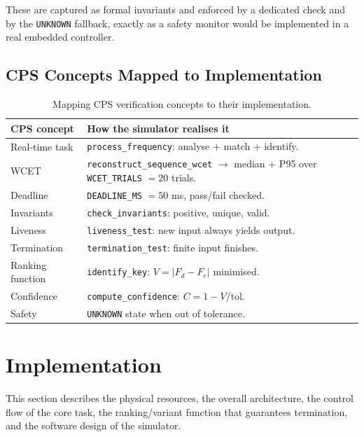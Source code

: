 \documentclass[11pt,a4paper]{article}
\newcommand{\Key}[1]{\texttt{#1}}
\begin{document}
These are captured as formal invariants and enforced by a dedicated check
and by the \Key{UNKNOWN} fallback, exactly as a safety monitor would be
implemented in a real embedded controller.

\subsection{CPS Concepts Mapped to Implementation}

\begin{table}[H]
    \centering
    \begin{tabular}{@{}lp{10.5cm}@{}}
        \toprule
        \textbf{CPS concept} & \textbf{How the simulator realises it} \\
        \midrule
        Real-time task & \texttt{process\_frequency}: analyse + match + identify. \\
        WCET & \texttt{reconstruct\_sequence\_wcet} $\rightarrow$ median + P95
            over \texttt{WCET\_TRIALS} $=20$ trials. \\
        Deadline & \texttt{DEADLINE\_MS} $=50$ ms, pass/fail checked. \\
        Invariants & \texttt{check\_invariants}: positive, unique, valid. \\
        Liveness & \texttt{liveness\_test}: new input always yields output. \\
        Termination & \texttt{termination\_test}: finite input finishes. \\
        Ranking function & \texttt{identify\_key}: $V=|F_d-F_e|$ minimised. \\
        Confidence & \texttt{compute\_confidence}: $C = 1 - V/\text{tol}$. \\
        Safety & \texttt{UNKNOWN} state when out of tolerance. \\
        \bottomrule
    \end{tabular}
    \caption{Mapping CPS verification concepts to their implementation.}
    \label{tab:cpsmap}
\end{table}

\section{Implementation}
\label{sec:impl}

This section describes the physical resources, the overall architecture, the
control flow of the core task, the ranking/variant function that guarantees
termination, and the software design of the simulator.
\end{document}
